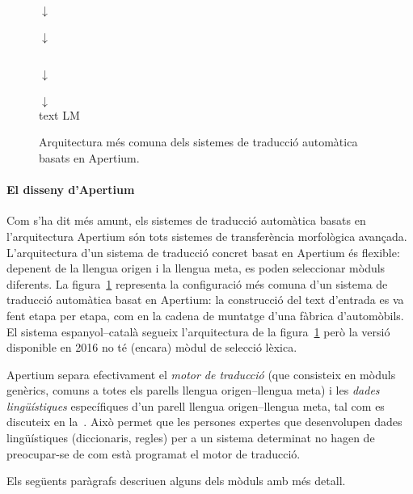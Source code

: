 \begin{figure}
{\begin{center}
{{\begin{center}
\(\downarrow\)\\
 \\
\(\downarrow\)\\
\vspace{-3ex}
\end{center}
}}
\\
\(\downarrow\)\\
 \\
\(\downarrow\)\\
text LM \\
\end{center}
}
\caption{Arquitectura més comuna dels sistemes de traducció automàtica basats en Apertium.}
\label{fg:modules}
\end{figure}

\paragraph{El disseny d'Apertium}
Com s'ha dit més amunt, els sistemes de traducció automàtica basats en
l'arquitectura Apertium són tots sistemes de transferència morfològica
avançada. L'arquitectura d'un sistema de traducció concret basat en
Apertium és flexible: depenent de la llengua origen i la llengua meta,
es poden seleccionar mòduls diferents. La figura~\ref{fg:modules}
representa la configuració més comuna d'un sistema de traducció
automàtica basat en Apertium: la construcció del text d'entrada es va
fent etapa per etapa, com en la cadena de muntatge d'una fàbrica
d'automòbils. El sistema espanyol--català segueix l'arquitectura de la
figura~\ref{fg:modules} però la versió disponible en 2016 no té
(encara) mòdul de selecció lèxica.

Apertium separa efectivament el \emph{motor de traducció} (que
consisteix en mòduls genèrics, comuns a totes els parells llengua
origen--llengua meta) i les \emph{dades lingüístiques} específiques
d'un parell llengua origen--llengua meta, tal com es discuteix en
la~\pageref{pg:separacio}. Això permet que les persones expertes que
desenvolupen dades lingüístiques (diccionaris, regles) per a un
sistema determinat no hagen de preocupar-se de com està programat el
motor de traducció.

Els següents paràgrafs descriuen alguns dels mòduls amb més detall.


